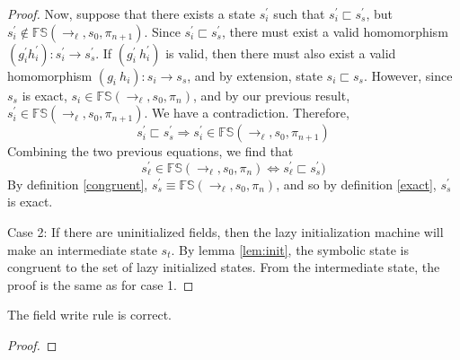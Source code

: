 \begin{proof}
Now, suppose that there exists a state $s_i^\prime$ such that $s_i^\prime \sqsubset s_s^\prime$, but $s_i^\prime \notin \mathbb{FS}(\rightarrow_{\ell},s_0,\pi_{n+1})$. Since $s_i^\prime \sqsubset s_s^\prime$, there must exist a valid homomorphism $(g_i^\prime h_i^\prime): s_i^\prime \rightarrow s_s^\prime$. If $(g_i^\prime\ h_i^\prime)$ is valid, then there must also exist a valid homomorphism $(g_i\ h_i) : s_i \rightarrow s_s$, and by extension, state $s_i \sqsubset s_s$. However, since $s_s$ is exact, $s_i \in \mathbb{FS}(\rightarrow_{\ell},s_0,\pi_{n})$, and by our previous result, $s_i^\prime \in \mathbb{FS}(\rightarrow_{\ell},s_0,\pi_{n+1})$. We have a contradiction. Therefore, $$s_i^\prime \sqsubset s_s^\prime \Rightarrow s_i^\prime \in \mathbb{FS}(\rightarrow_{\ell},s_0,\pi_{n+1})$$ Combining the two previous equations, we find that 
$$s_\ell^\prime \in \mathbb{FS}(\rightarrow_{\ell},s_0,\pi_n) \Leftrightarrow s_\ell^\prime \sqsubset s_s^\prime)$$
By definition \ref{congruent}, $s_s^\prime \equiv \mathbb{FS}(\rightarrow_{\ell},s_0,\pi_n)$, and so by definition \ref{exact}, $s_s^\prime$ is exact.

Case 2: If there are uninitialized fields, then the lazy initialization machine will make an intermediate state $s_t$. By lemma \ref{lem:init}, the symbolic state is congruent to the set of lazy initialized states. From the intermediate state, the proof is the same as for case 1.
\end{proof}

\begin{lemma}
The field write rule is correct.
\end{lemma}
\begin{proof}
\end{proof}

